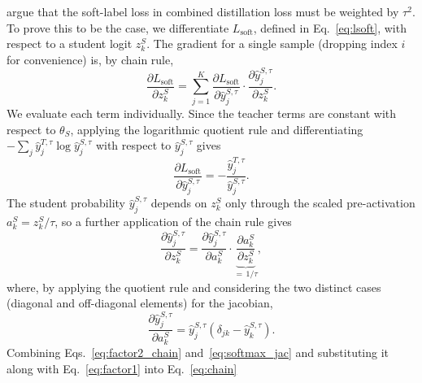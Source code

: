 \documentclass{article}
\theoremstyle{plain}
\theoremstyle{definition}
\theoremstyle{remark}
\begin{document}
\citet{hinton2015distilling} argue that the soft-label loss in combined distillation loss must be weighted by $\tau^2$. To prove this to be the case, we differentiate $L_{\mathrm{soft}}$, defined in Eq.~\eqref{eq:lsoft}, with respect to a student logit $z_k^S$. The gradient for a single sample (dropping index $i$ for convenience) is, by chain rule,
\begin{equation}
  \frac{\partial L_{\mathrm{soft}}}{\partial z_k^S}
  = \sum_{j=1}^{K}
      \frac{\partial L_{\mathrm{soft}}}{\partial \hat{y}_j^{S,\tau}}
      \cdot
      \frac{\partial \hat{y}_j^{S,\tau}}{\partial z_k^S}.
  \label{eq:chain}
\end{equation}
We evaluate each term individually. Since the teacher terms are
constant with respect to $\theta_S$, applying the logarithmic quotient rule and differentiating $-\sum_j \hat{y}_j^{T,\tau}\log\hat{y}_j^{S,\tau}$ with respect to $\hat{y}_j^{S,\tau}$ gives
\begin{equation}
  \frac{\partial L_{\mathrm{soft}}}{\partial \hat{y}_j^{S,\tau}}
  = -\frac{\hat{y}_j^{T,\tau}}{\hat{y}_j^{S,\tau}}.
  \label{eq:factor1}
\end{equation}
The student probability $\hat{y}_j^{S,\tau}$ depends on $z_k^S$
only through the scaled pre-activation $a_k^S = z_k^S/\tau$, so
a further application of the chain rule gives
\begin{equation}
  \frac{\partial \hat{y}_j^{S,\tau}}{\partial z_k^S}
  = \frac{\partial \hat{y}_j^{S,\tau}}{\partial a_k^S}
    \cdot
    \underbrace{\frac{\partial a_k^S}{\partial z_k^S}}_{=\,1/\tau},
  \label{eq:factor2_chain}
\end{equation}
where, by applying the quotient rule and considering the two distinct cases (diagonal and off-diagonal elements) for the jacobian,
\begin{equation}
  \frac{\partial \hat{y}_j^{S,\tau}}{\partial a_k^S}
  = \hat{y}_j^{S,\tau}\!\left(\delta_{jk} - \hat{y}_k^{S,\tau}\right).
  \label{eq:softmax_jac}
\end{equation}
Combining Eqs.~\eqref{eq:factor2_chain} and~\eqref{eq:softmax_jac} and substituting it along with Eq.~\eqref{eq:factor1} into Eq.~\eqref{eq:chain}
\end{document}
